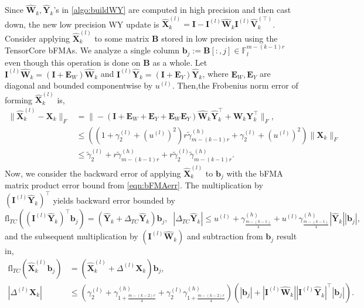 \documentclass[review,onefignum,onetabnum]{siamart190516}
\newcommand{\F}{\mathbb{F}}
\newcommand{\bb}[1]{\mathbf{#1}}
\newcommand{\fl}{\mathrm{fl}}
\begin{document}
Since $\hat{\bb{W}}_{k},\hat{\bb{Y}}_k$'s in \cref{algo:buildWY} are computed in high precision and then cast down, the new low precision WY update is $\hat{\bb{X}}_{k}^{(l)} = \bb{I}-\bb{I}^{(l)}\hat{\bb{W}}_k\bb{I}^{(l)}\hat{\bb{V}}_k^{(\top)}$.
Consider applying $\hat{\bb{X}}_k^{(l)}$ to some matrix $\bb{B}$ stored in low precision using the TensorCore bFMAs.
We analyze a single column $\bb{b}_j:=\bb{B}[:,j] \in \F_l^{m-(k-1)r}$ even though this operation is done on $\bb{B}$ as a whole.
Let $\bb{I}^{(l)}\hat{\bb{W}}_k = (\bb{I}+\bb{E}_W)\hat{\bb{W}}_k$ and $\bb{I}^{(l)}\hat{\bb{Y}}_k = (\bb{I}+\bb{E}_Y)\hat{\bb{Y}}_k$, where $\bb{E}_W,\bb{E}_Y$ are diagonal and bounded componentwise by $u^{(l)}$.
Then,the Frobenius norm error of forming $\hat{\bb{X}}_{k}^{(l)}$ is,
\begin{align*}
	\|\hat{\bb{X}}_{k}^{(l)}- \bb{X}_{k}\|_F  &= \|-\left(\bb{I}+\bb{E}_W+\bb{E}_Y+ \bb{E}_W\bb{E}_Y\right)\hat{\bb{W}}_k\hat{\bb{Y}}_k^{\top} + \bb{W}_k\bb{Y}_k^{\top}\|_F,\\
	&\leq \left((1+\gamma_2^{(l)}+(u^{(l)})^2)r\tilde{\gamma}_{m-(k-1)r}^{(h)}+\gamma_2^{(l)}+(u^{(l)})^2\right)\|\bb{X}_k\|_F\\
	&\leq \tilde{\gamma}_2^{(l)} +r\tilde{\gamma}_{m-(k-1)r}^{(h)} + r\tilde{\gamma}_2^{(l)}\tilde{\gamma}_{m-(k-1)r}^{(h)}.
\end{align*}
Now, we consider the backward error of applying $\hat{\bb{X}}_{k}^{(l)}$ to $\bb{b}_j$ with the bFMA matrix product error bound from \cref{eqn:bFMAerr}.
The multiplication by $(\bb{I}^{(l)}\hat{\bb{Y}}_k)^{\top}$ yields backward error bounded by
\begin{equation*}
	\fl_{TC}((\bb{I}^{(l)}\hat{\bb{Y}}_k)^{\top}\bb{b}_j) = (\hat{\bb{Y}}_k+\Delta_{TC}\hat{\bb{Y}}_k)\bb{b}_j,\;\;|\Delta_{TC}\hat{\bb{Y}}_k| \leq u^{(l)}+\gamma_{\frac{m-(k-1)}{4}}^{(h)}+u^{(l)}\gamma_{\frac{m-(k-1)}{4}}^{(h)}|\hat{\bb{Y}}_k||\bb{b}_j|,
\end{equation*}
and the subsequent multiplication by $(\bb{I}^{(l)}\hat{\bb{W}}_k)$ and subtraction from $\bb{b}_j$ result in,
\begin{align*}
	\fl_{TC}(\hat{\bb{X}}_{k}^{(l)}\bb{b}_j) &= (\hat{\bb{X}}_{k}^{(l)}+\Delta^{(l)}\bb{X}_k)\bb{b}_j,\\
	|\Delta^{(l)}\bb{X}_k| &\leq \left(\gamma_2^{(l)}+\gamma_{1+\frac{m-(k-2)r}{4}}^{(h)}+\gamma_2^{(l)}\gamma_{1+\frac{m-(k-2)r}{4}}^{(h)}\right)\left(|\bb{b}_j|+|\bb{I}^{(l)}\hat{\bb{W}}_k||\bb{I}^{(l)}\hat{\bb{Y}}_k|^{\top}|\bb{b}_j|\right).
\end{align*}
\end{document}
